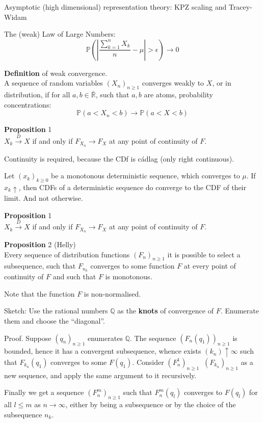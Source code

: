 \documentclass[a4paper]{article}
\newcommand{\brac}[1]{{\left ( #1 \right )}}
\newcommand{\abs}[1]{{\left | #1 \right |}}
\newcommand{\Rbar}{{\bar{\mathbb{R}}}}
\newcommand{\pr}{\mathbb{P}}
\newcommand{\defn}{\mathop{\overset{\Delta}{=}}\nolimits}
\begin{document}

Asymptotic (high dimensional) representation theory:
KPZ scaling and Tracey-Widam

The (weak) Law of Large Numbers:
\[\pr\brac{\abs{ \frac{\sum_{k=1}^n X_k}{n}-\mu }>\epsilon} \to 0\]


\noindent \textbf{Definition} of weak convergence. \hfill\\
A sequence of random variables $\brac{X_n}_{n\geq1}$ converges weakly to $X$, or in distribution, if for all $a,b\in \Rbar$, such that $a,b$ are atoms, probability concentrations:
\[\pr\brac{a<X_n<b}\to \pr\brac{a<X<b}\]

\noindent \textbf{Proposition} 1\hfill \\
$X_k\overset{D}{\to}X$ if and only if $F_{X_n}\to F_X$ at any point of continuity of $F$.

Continuity is required, because the CDf is c\'adlag (only right continuous).

Let $\brac{x_k}_{k\geq0}$ be a monotonous deterministic sequence, which converges to $\mu$.
If $x_k\uparrow$, then CDFs of a deterministic sequence do converge to the CDF of their limit. And not otherwise.

\noindent \textbf{Proposition} 1\hfill \\
$X_k\overset{D}{\to}X$ if and only if $F_{X_n}\to F_X$ at any point of continuity of $F$.

\noindent \textbf{Proposition} 2 (Helly)\hfill \\
Every sequence of distribution functions $\brac{F_n}_{n\geq1}$ it is possible to select a subsequence, such that $F_{n_k}$ converges to some function $F$ at every point of continuity of $F$ and such that $F$ is monotonous.

Note that the function $F$ is non-normalised.

Sketch:
Use the rational numbers $\mathbb{Q}$ as the \textbf{knots} of convergence of $F$. Enumerate them and choose the ``diagonal''.

Proof. Suppose $\brac{q_n}_{n\geq 1}$ enumerates $\mathbb{Q}$.
The sequence $\brac{F_n(q_1)}_{n\geq1}$ is bounded, hence it has a convergent subsequence, whence exists $\brac{k_n}\uparrow\infty$ such that $F_{k_n}(q_1)$ converges to some $F(q_1)$.
Consider $\brac{F^1_n}_{n\geq 1}\defn\brac{F_{k_n}}_{n\geq1}$ as a new sequence, and apply the same argument to it recursively.

Finally we get a sequence $\brac{F^m_n}_{n\geq1}$ such that $F^m_n(q_l)$ converges to $F(q_l)$ for all $l\leq m$ as $n\to \infty$, either by being a subsequence or by the choice of the subsequence $n_k$.
\end{document}
